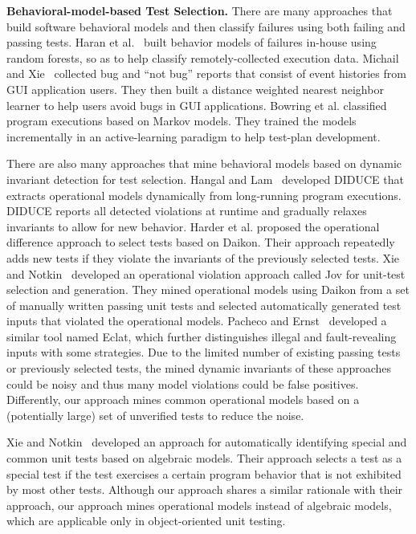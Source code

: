 \documentclass{sig-alternate}
\begin{document}
\textbf{Behavioral-model-based Test Selection.} There are many
approaches that build software behavioral models and then classify
failures using both failing and passing tests. Haran et
al.~\cite{Haran05} built behavior models of failures in-house using
random forests, so as to help classify remotely-collected execution
data. Michail and Xie~\cite{Michail05} collected bug and ``not bug''
reports that consist of event histories from GUI application users.
They then built a distance weighted nearest neighbor learner to help
users avoid bugs in GUI applications. Bowring et al.
\cite{Bowring04} classified program executions based on Markov
models. They trained the models incrementally in an active-learning
paradigm to help test-plan development.

There are also many approaches that mine behavioral models based on
dynamic invariant detection for test selection. Hangal and
Lam~\cite{Hangal02} developed DIDUCE that extracts operational
models dynamically from long-running program executions. DIDUCE
reports all detected violations at runtime and gradually relaxes
invariants to allow for new behavior. Harder et al. \cite{Harder03}
proposed the operational difference approach to select tests based
on Daikon. Their approach repeatedly adds new tests if they violate
the invariants of the previously selected tests. Xie and
Notkin~\cite{Xie03} developed an operational violation approach
called Jov for unit-test selection and generation. They mined
operational models using Daikon from a set of manually written
passing unit tests and selected automatically generated test inputs
that violated the operational models. Pacheco and
Ernst~\cite{Pacheco05} developed a similar tool named Eclat, which
further distinguishes illegal and fault-revealing inputs with some
strategies. Due to the limited number of existing passing tests or
previously selected tests, the mined dynamic invariants of these
approaches could be noisy and thus many model violations could be
false positives. Differently, our approach mines common operational
models based on a (potentially large) set of unverified tests to
reduce the noise.

Xie and Notkin~\cite{Xie05} developed an approach for automatically
identifying special and common unit tests based on algebraic models.
Their approach selects a test as a special test if the test
exercises a certain program behavior that is not exhibited by most
other tests. Although our approach shares a similar rationale with
their approach, our approach mines operational models instead of
algebraic models, which are applicable only in object-oriented unit
testing.
\end{document}
